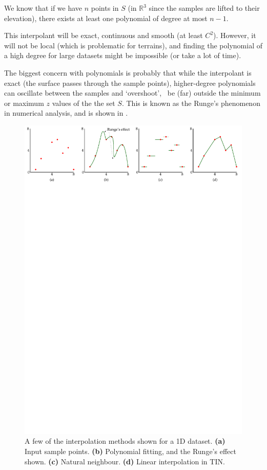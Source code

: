 We know that if we have $n$ points in $S$ (in $\mathbb{R}^3$ since the samples are lifted to their elevation), there exists at least one polynomial of degree at most $n-1$.

This interpolant will be exact, continuous and smooth (at least $C^2$).
However, it will not be local (which is problematic for terrains), and finding the polynomial of a high degree for large datasets might be impossible (or take a lot of time).

The biggest concern with polynomials is probably that while the interpolant is exact (the surface passes through the sample points), higher-degree polynomials can oscillate between the samples and `overshoot', \ie\ be (far) outside the minimum or maximum $z$ values of the the set $S$.
This is known as the Runge's phenomenon in numerical analysis,%
and is shown in .
\begin{figure}
  \centering
  \includegraphics[width=\linewidth]{figs/polynomial}
  \caption{A few of the interpolation methods shown for a 1D dataset. \textbf{(a)} Input sample points. \textbf{(b)} Polynomial fitting, and the Runge's effect shown. \textbf{(c)} Natural neighbour. \textbf{(d)} Linear interpolation in TIN.}%
\end{figure}



